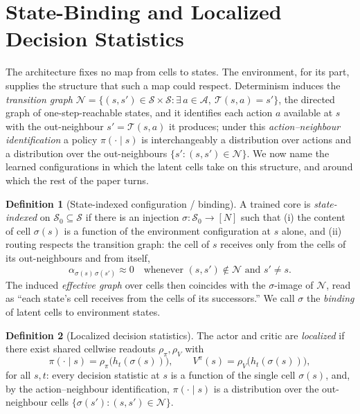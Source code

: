 \documentclass{article} %
\theoremstyle{plain}
\theoremstyle{definition}
\newtheorem{definition}{Definition}[section]
\begin{document}
\section{State-Binding and Localized Decision Statistics}
\label{sec:binding}

The architecture fixes no map from cells to states. The environment, for its
part, supplies the structure that such a map could respect. Determinism
induces the \emph{transition graph}
$\mathcal N=\{(s,s')\in\mathcal S\times\mathcal S:\exists\,a\in\mathcal A,\
\mathcal T(s,a)=s'\}$, the directed graph of one-step-reachable states, and it
identifies each action $a$ available at $s$ with the out-neighbour
$s'=\mathcal T(s,a)$ it produces; under this \emph{action--neighbour
identification} a policy $\pi(\cdot\mid s)$ is interchangeably a distribution
over actions and a distribution over the out-neighbours
$\{s':(s,s')\in\mathcal N\}$. We now name the learned configurations in which
the latent cells take on this structure, and around which the rest of the
paper turns.

\begin{definition}[State-indexed configuration / binding]
\label{def:indexed}
A trained core is \emph{state-indexed} on $\mathcal S_0\subseteq\mathcal S$ if
there is an injection $\sigma:\mathcal S_0\to[N]$ such that (i) the content of
cell $\sigma(s)$ is a function of the environment configuration at $s$ alone,
and (ii) routing respects the transition graph: the cell of $s$ receives only
from the cells of its out-neighbours and from itself,
\begin{equation*}
  \alpha_{\sigma(s)\,\sigma(s')}\approx 0
  \quad\text{whenever } (s,s')\notin\mathcal N \text{ and } s'\neq s.
\end{equation*}
The induced \emph{effective graph} over cells then coincides with the
$\sigma$-image of $\mathcal N$, read as ``each state's cell receives from the
cells of its successors.'' We call $\sigma$ the \emph{binding} of latent cells
to environment states.
\end{definition}

\begin{definition}[Localized decision statistics]
\label{def:localized}
The actor and critic are \emph{localized} if there exist shared cellwise
readouts $\rho_\pi,\rho_V$ with
\begin{equation}
  \pi(\cdot\mid s)=\rho_\pi\!\bigl(h_t(\sigma(s))\bigr),
  \qquad
  V^{\pi}(s)=\rho_V\!\bigl(h_t(\sigma(s))\bigr),
  \label{eq:localized}
\end{equation}
for all $s,t$: every decision statistic at $s$ is a function of the single cell
$\sigma(s)$, and, by the action--neighbour identification, $\pi(\cdot\mid s)$
is a distribution over the out-neighbour cells
$\{\sigma(s'):(s,s')\in\mathcal N\}$.
\end{definition}
\end{document}
